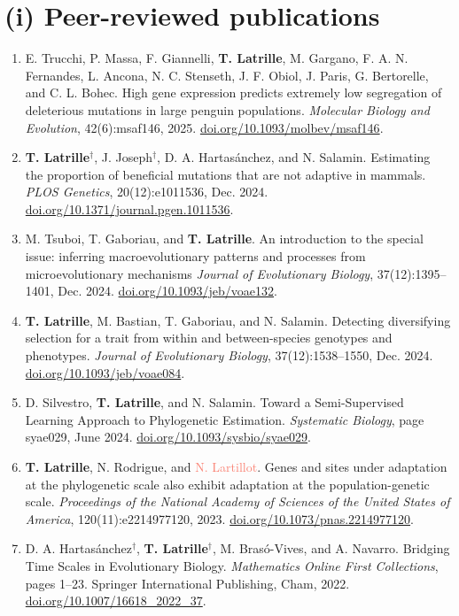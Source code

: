 \documentclass[11pt,a4paper]{moderncv}
\begin{document}
\section*{(i) Peer-reviewed publications}
\begin{enumerate}
\setlength\itemsep{1em}
    \item E. Trucchi, P. Massa, F. Giannelli, \textbf{T. Latrille}, M. Gargano, F. A. N. Fernandes, L. Ancona, N. C. Stenseth, J. F. Obiol, J. Paris, G. Bertorelle, and C. L. Bohec. High gene expression predicts extremely low segregation of deleterious mutations in large penguin populations. \textit{Molecular Biology and Evolution}, 42(6):msaf146, 2025. \href{https://doi.org/10.1093/molbev/msaf146}{doi.org/10.1093/molbev/msaf146}.
    \item \textbf{T. Latrille}$^{\dag}$, J. Joseph$^{\dag}$, D. A. Hartasánchez, and N. Salamin. Estimating the proportion of beneficial mutations that are not adaptive in mammals. \textit{PLOS Genetics}, 20(12):e1011536, Dec. 2024. \href{https://doi.org/10.1371/journal.pgen.1011536}{doi.org/10.1371/journal.pgen.1011536}.
    \item M. Tsuboi, T. Gaboriau, and \textbf{T. Latrille}. An introduction to the special issue: inferring macroevolutionary patterns and processes from microevolutionary mechanisms \textit{Journal of Evolutionary Biology}, 37(12):1395–1401, Dec. 2024. \href{https://doi.org/10.1093/jeb/voae132}{doi.org/10.1093/jeb/voae132}.
    \item \textbf{T. Latrille}, M. Bastian, T. Gaboriau, and N. Salamin. Detecting diversifying selection for a trait from within and between-species genotypes and phenotypes. \textit{Journal of Evolutionary Biology}, 37(12):1538–1550, Dec. 2024. \href{https://doi.org/10.1093/jeb/voae084}{doi.org/10.1093/jeb/voae084}.
    \item D. Silvestro, \textbf{T. Latrille}, and N. Salamin. Toward a Semi-Supervised Learning Approach to Phylogenetic Estimation. \textit{Systematic Biology}, page syae029, June 2024. \href{https://doi.org/10.1093/sysbio/syae029}{doi.org/10.1093/sysbio/syae029}.
    \item \textbf{T. Latrille}, N. Rodrigue, and \textcolor{Salmon}{N. Lartillot}. Genes and sites under adaptation at the phylogenetic scale also exhibit adaptation at the population-genetic scale. \textit{Proceedings of the National Academy of Sciences of the United States of America}, 120(11):e2214977120, 2023. \href{https://doi.org/10.1073/pnas.2214977120}{doi.org/10.1073/pnas.2214977120}.
    \item D. A. Hartasánchez$^{\dag}$, \textbf{T. Latrille}$^{\dag}$, M. Brasó-Vives, and A. Navarro. Bridging Time Scales in Evolutionary Biology. \textit{Mathematics Online First Collections}, pages 1–23. Springer International Publishing, Cham, 2022. \href{https://doi.org/10.1007/16618_2022_37}{doi.org/10.1007/16618\_2022\_37}.

\end{enumerate}
\end{document}
